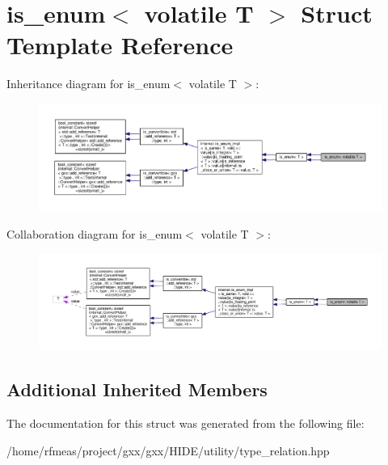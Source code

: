 \hypertarget{structis__enum_3_01volatile_01T_01_4}{}\section{is\+\_\+enum$<$ volatile T $>$ Struct Template Reference}
\label{structis__enum_3_01volatile_01T_01_4}


Inheritance diagram for is\+\_\+enum$<$ volatile T $>$\+:
\nopagebreak
\begin{figure}[H]
\begin{center}
\leavevmode
\includegraphics[width=350pt]{structis__enum_3_01volatile_01T_01_4__inherit__graph}
\end{center}
\end{figure}


Collaboration diagram for is\+\_\+enum$<$ volatile T $>$\+:
\nopagebreak
\begin{figure}[H]
\begin{center}
\leavevmode
\includegraphics[width=350pt]{structis__enum_3_01volatile_01T_01_4__coll__graph}
\end{center}
\end{figure}
\subsection*{Additional Inherited Members}


The documentation for this struct was generated from the following file\+:\begin{DoxyCompactItemize}
\item 
/home/rfmeas/project/gxx/gxx/\+H\+I\+D\+E/utility/type\+\_\+relation.\+hpp\end{DoxyCompactItemize}
